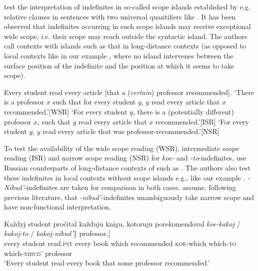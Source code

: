 \documentclass[output=paper,colorlinks,citecolor=brown]{langscibook}
\begin{document}
\citeauthor{Marti.Ionin2019} test the interpretation of indefinites in so-called scope islands established by e.g. relative clauses in sentences with two universal quantifiers like . It has been observed that indefinites occurring in such scope islands may receive exceptional wide scope, i.e. their scope may reach outside the syntactic island. The authors call contexts with islands such as that in  long-distance contexts (as opposed to local contexts like in our example , where no island intervenes between the surface position of the indefinite and the position at which it seems to take scope). 

\ea Every student read every article [that a (\textit{certain}) professor recommended].\label{geist:ex:marti-ionin1}
\ea  `There is a professor $x$ such that for every student $y$, $y$ read every article that $x$ recommended.'\hfill [WSR]
\ex `For every student $y$, there is a (potentially different) professor $x$, such that $y$ read every article that $x$ recommended.'\hfill [ISR]
\ex `For every student $y$, $y$ read every article that was professor-recommended.'\hfill [NSR]\smallskip\\\hfill\citep[ex. (1)]{Marti.Ionin2019}
\z\z

\noindent To test the availability of the wide scope reading (WSR), intermediate scope reading (ISR) and narrow scope reading (NSR) for \textit{koe-} and \textit{-to}-indefinites, \citeauthor{Marti.Ionin2019} use Russian counterparts of long-distance contexts of  such as . The authors also test these indefinites in local contexts without scope islands e.g., like our example . \textit{-Nibud’}-indefinites are taken for comparison in both cases. \citeauthor{Marti.Ionin2019} assume, following previous literature, that \textit{-nibud’}-indefinites unambiguously take narrow scope and have non-functional interpretation.

\ea\label{geist:ex:marti-ionin2}
\gll Každyj student pročital každuju knigu, \minsp{[} kotoruju porekomendoval\hspace{.9cm} \minsp{\{} \textit{koe-kakoj} / \textit{kakoj-to} / \textit{kakoj-nibud’}\} professor.]\\
every student read.\textsc{pst} every book {} which recommended {} \textsc{koe}-which {} which-\textsc{to} {} which-\textsc{nibud'} professor\\
\glt ‘Every student read every book that some professor recommended.’\\\hfill\citep[ex. (6)]{Marti.Ionin2019}
\z
\end{document}
